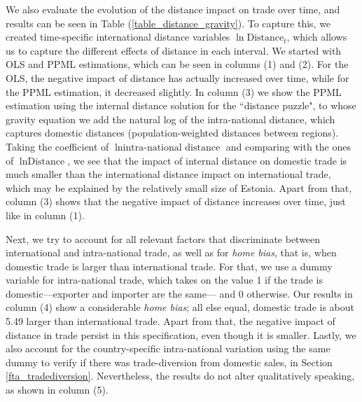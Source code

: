 \documentclass[a4paper,10pt]{article}
\begin{document}
We also evaluate the evolution of the distance impact on trade over time, and results can be seen in Table (\ref{table_distance_gravity}). To capture this, we created time-specific international distance variables $\ln \text{Distance}_{t}$, which allows us to capture the different effects of distance in each interval. We started with OLS and PPML estimations, which can be seen in columns (1) and (2). For the OLS, the negative impact of distance has actually increased over time, while for the PPML estimation, it decreased slightly. In column (3) we show the PPML estimation using the internal distance solution for the ``distance puzzle", to whose gravity equation we add the natural log of the intra-national distance, which captures domestic distances (population-weighted distances between regions). Taking the coefficient of $\ln \text{intra-national distance}$ and comparing with the ones of $\ln \text{Distance}$, we see that the impact of internal distance on domestic trade is much smaller than the international distance impact on international trade, which may be explained by the relatively small size of Estonia. Apart from that, column (3) shows that the negative impact of distance increases over time, just like in column (1).

Next, we try to account for all relevant factors that discriminate between international and intra-national trade, as well as for \textit{home bias}, that is, when domestic trade is larger than international trade. For that, we use a dummy variable for intra-national trade, which takes on the value 1 if the trade is domestic---exporter and importer are the same--- and 0 otherwise. Our results in column (4) show a considerable \textit{home bias}; all else equal, domestic trade is about 5.49 larger than international trade. Apart from that, the negative impact of distance in trade persist in this specification, even though it is smaller. Lastly, we also account for the country-specific intra-national variation using the same dummy to verify if there was trade-diversion from domestic sales, in Section \ref{fta_tradediversion}. Nevertheless, the results do not alter qualitatively speaking, as shown in column (5).


\end{document}
